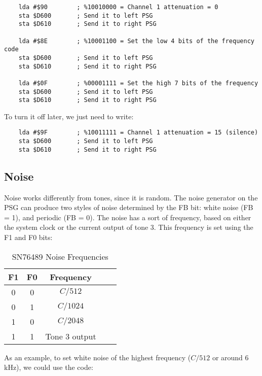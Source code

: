 \begin{verbatim}
    lda #$90        ; %10010000 = Channel 1 attenuation = 0
    sta $D600       ; Send it to left PSG
    sta $D610       ; Send it to right PSG

    lda #$8E        ; %10001100 = Set the low 4 bits of the frequency code
    sta $D600       ; Send it to left PSG
    sta $D610       ; Send it to right PSG

    lda #$0F        ; %00001111 = Set the high 7 bits of the frequency
    sta $D600       ; Send it to left PSG
    sta $D610       ; Send it to right PSG
\end{verbatim}
To turn it off later, we just need to write:

\begin{verbatim}
    lda #$9F        ; %10011111 = Channel 1 attenuation = 15 (silence)
    sta $D600       ; Send it to left PSG
    sta $D610       ; Send it to right PSG
\end{verbatim}

\subsection{Noise}

Noise works differently from tones, since it is random. The noise generator on the PSG can produce two styles of noise determined by the FB bit: white noise (FB = 1), and periodic (FB = 0). The noise has a sort of frequency, based on either the system clock or the current output of tone 3. This frequency is set using the F1 and F0 bits:

\begin{table}[h]
	\begin{center}
		\begin{tabular}{|c|c|c|c|l|} \hline
			F1 & F0 & Frequency \\ \hline \hline
			0 & 0 & $C / 512$ \\ \hline
			0 & 1 & $C / 1024$ \\ \hline
			1 & 0 & $C / 2048$ \\ \hline
			1 & 1 & Tone 3 output \\ \hline
		\end{tabular}
		\caption{SN76489 Noise Frequencies}
	\end{center}
	\label{tab:psg_noise_freq}
\end{table}

As an example, to set white noise of the highest frequency ($C / 512$ or around 6 kHz), we could use the code:

